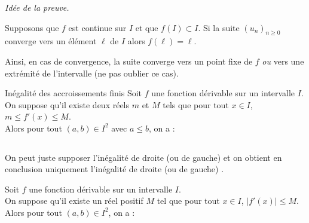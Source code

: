 \documentclass[french,11pt,twoside]{VcCours}
\begin{document}
\emph{Idée de la preuve.}

\vspace*{10cm}

\newpage
\begin{Proposition}{} Supposons que $f$ est continue sur $I$ et que $f(I) \subset I$. Si la suite $(u_n)_{n \geq 0}$ converge vers un élément $\ell$ de $I$ alors $f(\ell)= \ell$.
\end{Proposition}

\begin{Remarque}{} Ainsi, en cas de convergence, la suite converge vers un point fixe de $f$ \emph{ou} vers une extrémité de l'intervalle (ne pas oublier ce cas).
\end{Remarque}

\begin{Theoreme}{Inégalité des accroissements finis}
Soit $f$ une fonction dérivable sur un intervalle $I$. \\
On suppose qu'il existe deux réels $m$ et $M$ tels que pour tout $x \in I$, $m \leq f'(x) \leq M$.\\
Alors pour tout $(a,b) \in I^2$ avec $a \leq b$, on a :
 $$ \phantom{m(b-a) \leq f(b)-f(a) \leq M (b-a)}$$
\end{Theoreme}

\begin{Remarque}{} On peut juste supposer l'inégalité \og  de droite (ou de gauche) \fg et on obtient en conclusion uniquement  l'inégalité \og  de droite (ou de gauche) \fg .
\end{Remarque}

\begin{Corollaire}{}
Soit $f$ une fonction dérivable sur un intervalle $I$.\\
On suppose qu'il existe un réel positif $M$ tel que  pour tout $x \in I$, $ |f'(x)| \leq M$. \\ 
Alors pour tout $(a,b) \in I^2$, on a :
$$\phantom{ |f(b)-f(a)| \leq M |b-a|}$$
\end{Corollaire}
\end{document}

